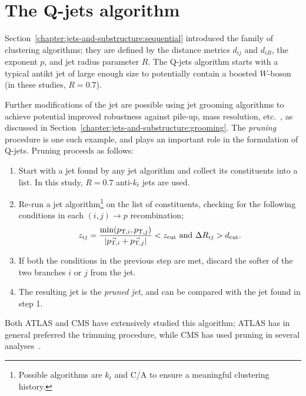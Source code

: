 \section{The Q-jets algorithm}
\label{app:qjets:intro:algorithm}

Section~\ref{chapter:jets-and-substructure:sequential} introduced the \kt family of clustering algorithms; they are defined by the distance metrics $d_{ij}$ and $d_{iB}$, the exponent $p$, and jet radius parameter $R$. The Q-jets algorithm starts with a typical antikt jet of large enough size to potentially contain a boosted $W$-boson (in these studies, $R=0.7$). 

Further modifications of the jet are possible using jet grooming algorithms to achieve potential improved robustness against pile-up, mass resolution, etc.~\cite{Krohn:2009th,Ellis:2009me,pruning2009}, as discussed in Section~\ref{chapter:jets-and-substructure:grooming}. The \emph{pruning} procedure\cite{Ellis:2009me} is one such example, and plays an important role in the formulation of Q-jets. Pruning proceeds as follows:
%
\begin{enumerate}
      \item Start with a jet found by any jet algorithm and collect its constituents into a list. In this study, $R=0.7$ anti-$k_t$ jets are used.%
      \item Re-run a jet algorithm\footnote{Possible algorithms are $k_t$ and C/A to ensure a meaningful clustering history.} on the list of constituents, checking for the following conditions in each $(i,j) \to p$ recombination;
      \begin{equation}
        z_{ij}=\frac{\min(p_{{\rm T},i}, p_{{\rm T},j})}{|\vec{p_{{\rm T},i}}+\vec{p_{{\rm T},j}}|}<z_{\rm cut}~\mathrm{and}~\Delta R_{ij} > d_{\rm cut}.
         \label{eqn:pruning:cuts}
      \end{equation}
      \item If both the conditions in the previous step are met, discard the softer of the two branches $i$ or $j$ from the jet.
      \item The resulting jet is the \emph{pruned jet}, and can be compared with the jet found in step 1.
\end{enumerate}
%
Both ATLAS and CMS have extensively studied this algorithm; ATLAS has in general preferred the trimming procedure, while CMS has used pruning in several analyses~\cite{ATLAS-SS-2011,Aad:2015fna,Khachatryan:2014gha}.

